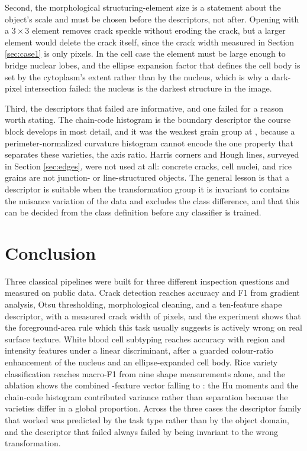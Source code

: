 \documentclass{ieeeaccess}
\begin{document}
Second, the morphological structuring-element size is a statement about the
object's scale and must be chosen before the descriptors, not after. Opening with
a $3\times3$ element removes crack speckle without eroding the crack, but a
larger element would delete the crack itself, since the crack width measured in
Section \ref{sec:case1} is only \crackWidth{} pixels. In the cell case the
element must be large enough to bridge nuclear lobes, and the ellipse expansion
factor that defines the cell body is set by the cytoplasm's extent rather than by
the nucleus, which is why a dark-pixel intersection failed: the nucleus is the
darkest structure in the image.

Third, the descriptors that failed are informative, and one failed for a reason
worth stating. The chain-code histogram is the boundary descriptor the course
block develops in most detail, and it was the weakest grain group at
\riceChainOne{}, because a perimeter-normalized curvature histogram cannot encode
the one property that separates these varieties, the axis ratio. Harris corners
and Hough lines, surveyed in Section \ref{sec:edges}, were not used at all:
concrete cracks, cell nuclei, and rice grains are not junction- or
line-structured objects. The general lesson is that a descriptor is suitable when
the transformation group it is invariant to contains the nuisance variation of
the data and excludes the class difference, and that this can be decided from the
class definition before any classifier is trained.

\section{Conclusion}
\label{sec:conclusion}
Three classical pipelines were built for three different inspection questions and
measured on public data. Crack detection reaches accuracy \crackAcc{} and F1
\crackFone{} from gradient analysis, Otsu thresholding, morphological cleaning, and
a ten-feature shape descriptor, with a measured crack width of \crackWidth{}
pixels, and the experiment shows that the foreground-area rule which this task
usually suggests is actively wrong on real surface texture. White blood cell
subtyping reaches accuracy \wbcAcc{} with region and intensity features under a
linear discriminant, after a guarded colour-ratio enhancement of the nucleus and an
ellipse-expanded cell body. Rice variety classification reaches macro-F1
\riceMorphOne{} from nine shape measurements alone, and the ablation shows the
combined \riceFeatures-feature vector falling to \riceAllOne{}: the Hu moments and
the chain-code histogram contributed variance rather than separation because the
varieties differ in a global proportion. Across the three cases the descriptor
family that worked was predicted by the task type rather than by the object
domain, and the descriptor that failed always failed by being invariant to the
wrong transformation.
\end{document}
